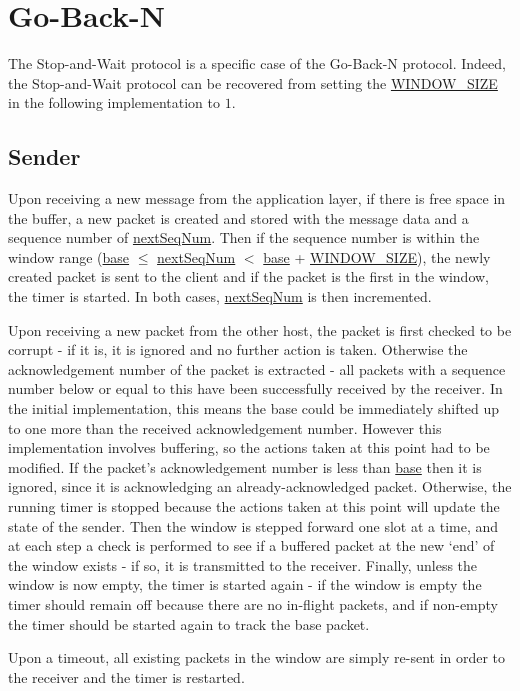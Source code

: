 \documentclass[a4paper]{article}
\newcommand{\code}{\url}
\begin{document}
\section{Go-Back-N}

The Stop-and-Wait protocol is a specific case of the Go-Back-N protocol. Indeed, the Stop-and-Wait protocol can be recovered from setting the \code{WINDOW_SIZE} in the following implementation to $1$.

\subsection{Sender}

Upon receiving a new message from the application layer, if there is free space in the buffer, a new packet is created and stored with the message data and a sequence number of \code{nextSeqNum}. Then if the sequence number is within the window range (\code{base} $\leq$ \code{nextSeqNum} $<$ \code{base} + \code{WINDOW_SIZE}), the newly created packet is sent to the client and if the packet is the first in the window, the timer is started. In both cases, \code{nextSeqNum} is then incremented.

Upon receiving a new packet from the other host, the packet is first checked to be corrupt - if it is, it is ignored and no further action is taken. Otherwise the acknowledgement number of the packet is extracted - all packets with a sequence number below or equal to this have been successfully received by the receiver. In the initial implementation, this means the base could be immediately shifted up to one more than the received acknowledgement number. However this implementation involves buffering, so the actions taken at this point had to be modified. If the packet's acknowledgement number is less than \code{base} then it is ignored, since it is acknowledging an already-acknowledged packet. Otherwise, the running timer is stopped because the actions taken at this point will update the state of the sender. Then the window is stepped forward one slot at a time, and at each step a check is performed to see if a buffered packet at the new `end' of the window exists - if so, it is transmitted to the receiver. Finally, unless the window is now empty, the timer is started again - if the window is empty the timer should remain off because there are no in-flight packets, and if non-empty the timer should be started again to track the base packet.

Upon a timeout, all existing packets in the window are simply re-sent in order to the receiver and the timer is restarted.
\end{document}
